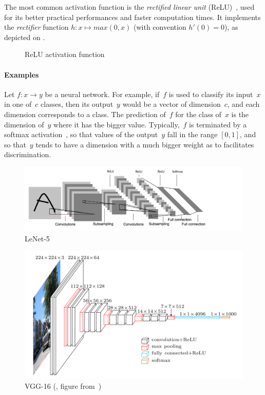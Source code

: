 The most common activation function is the \emph{rectified linear unit} (ReLU)~\citep{glorot2011deep}, used for its better practical performances and faster computation times. It implements the \emph{rectifier} function $h: x \mapsto max(0,x)$ (with convention $h'(0) = 0$), as depicted on .

 \begin{figure}[htbp]
 \centering
 \caption{ReLU activation function}
 \label{fig:relu}
 \end{figure}

\paragraph{Examples}
Let $f: x \to y$ be a neural network. For example, if~$f$ is used to classify its input~$x$ in one of~$c$ classes, then its output~$y$ would be a vector of dimension~$c$,  and each dimension corresponds to a class. The prediction of~$f$ for the class of~$x$ is the dimension of~$y$ where it has the bigger value. Typically,~$f$ is terminated by a softmax activation~\citep{wiki:soft}, so that values of the output~$y$ fall in the range $[0,1]$, and so that~$y$ tends to have a dimension with a much bigger weight as to facilitates discrimination.

\begin{figure}[p]
\centering\includegraphics[scale=0.5]{chapter1/lenet5.png}
\caption{LeNet-5 \citep{lecun1989backpropagation}}
\label{fig:lenet}
\end{figure}

\begin{figure}[p]
\centering\includegraphics[scale=0.8]{chapter1/vgg16.png}
\caption{VGG-16 (\cite{simonyan2014very}, figure from~\cite{vgg})}
\label{fig:vgg}
\end{figure}

